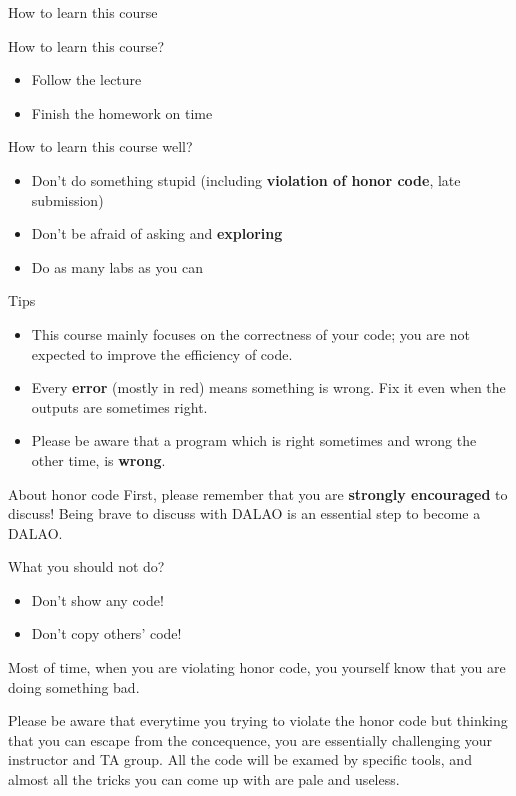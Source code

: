 \begin{frame}
\end{frame}

\begin{frame}{How to learn this course}
\begin{block}{How to learn this course?}
\begin{itemize}
    \item Follow the lecture
    \item Finish the homework on time
\end{itemize}
\end{block}

\begin{block}{How to learn this course well?}
\begin{itemize}
    \item Don't do something stupid (including \textbf{violation of honor code}, late submission)
    \item Don't be afraid of asking and \textbf{exploring}
    \item Do as many labs as you can
\end{itemize}
\end{block}
\end{frame}

\begin{frame}
\begin{block}{Tips}
\begin{itemize}
\item This course mainly focuses on the correctness of your code; you are not expected to improve the efficiency of code.
\item Every \textbf{error} (mostly in red) means something is wrong. Fix it even when the outputs are sometimes right.
\item Please be aware that a program which is right sometimes and wrong the other time, is \textbf{wrong}.
\end{itemize}
\end{block}
\end{frame}

\begin{frame}{About honor code}
First, please remember that you are \textbf{strongly encouraged} to discuss! Being brave to discuss with DALAO is an essential step to become a DALAO.

\begin{block}{What you should not do?}
\begin{itemize}
    \item Don't show any code! 
    \item Don't copy others' code! 
\end{itemize}
\end{block}
Most of time, when you are violating honor code, you yourself know that you are doing something bad. 

Please be aware that everytime you trying to violate the honor code but thinking that you can escape from the concequence, you are essentially challenging your instructor and TA group. All the code will be examed by specific tools, and almost all the tricks you can come up with are pale and useless. 
\end{frame}